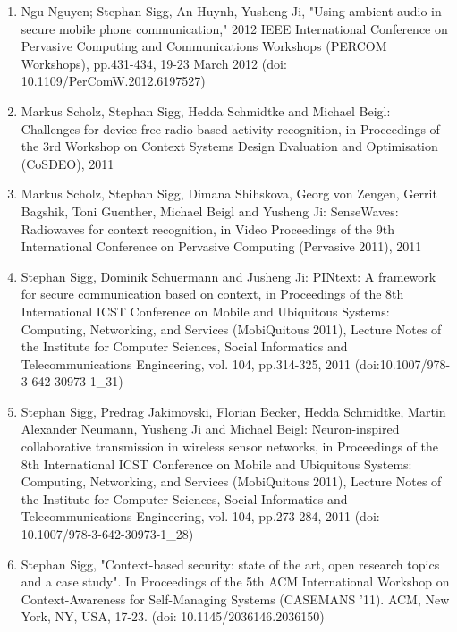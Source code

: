 \documentclass[10pt]{article}
\newcounter{saveenumi}
\begin{document}
\begin{enumerate}
\setcounter{enumi}{\value{saveenumi}}
\item Ngu Nguyen; Stephan Sigg, An Huynh, Yusheng Ji, "Using ambient audio in secure mobile phone communication," 2012 IEEE International Conference on Pervasive Computing and Communications Workshops (PERCOM Workshops), pp.431-434, 19-23 March 2012 (doi: 10.1109/PerComW.2012.6197527)
\item Markus Scholz, Stephan Sigg, Hedda Schmidtke and Michael Beigl: Challenges for device-free radio-based activity recognition, in Proceedings of the 3rd Workshop on Context Systems Design Evaluation and Optimisation (CoSDEO), 2011
\item Markus Scholz, Stephan Sigg, Dimana Shihskova, Georg von Zengen, Gerrit Bagshik, Toni Guenther, Michael Beigl and Yusheng Ji: SenseWaves: Radiowaves for context recognition, in Video Proceedings of the 9th International Conference on Pervasive Computing (Pervasive 2011), 2011
\item Stephan Sigg, Dominik Schuermann and Jusheng Ji: PINtext: A framework for secure communication based on context, in Proceedings of the 8th International ICST Conference on Mobile and Ubiquitous Systems: Computing, Networking, and Services (MobiQuitous 2011), Lecture Notes of the Institute for Computer Sciences, Social Informatics and Telecommunications Engineering, vol. 104, pp.314-325, 2011 (doi:10.1007/978-3-642-30973-1\_31)
\item Stephan Sigg, Predrag Jakimovski, Florian Becker, Hedda Schmidtke, Martin Alexander Neumann, Yusheng Ji and Michael Beigl: Neuron-inspired collaborative transmission in wireless sensor networks, in Proceedings of the 8th International ICST Conference on Mobile and Ubiquitous Systems: Computing, Networking, and Services (MobiQuitous 2011), Lecture Notes of the Institute for Computer Sciences, Social Informatics and Telecommunications Engineering, vol. 104, pp.273-284, 2011 (doi: 10.1007/978-3-642-30973-1\_28)
\item Stephan Sigg, "Context-based security: state of the art, open research topics and a case study". In Proceedings of the 5th ACM International Workshop on Context-Awareness for Self-Managing Systems (CASEMANS '11). 	ACM, New York, NY, USA, 17-23. (doi: 10.1145/2036146.2036150) 

\end{enumerate}
\end{document}
